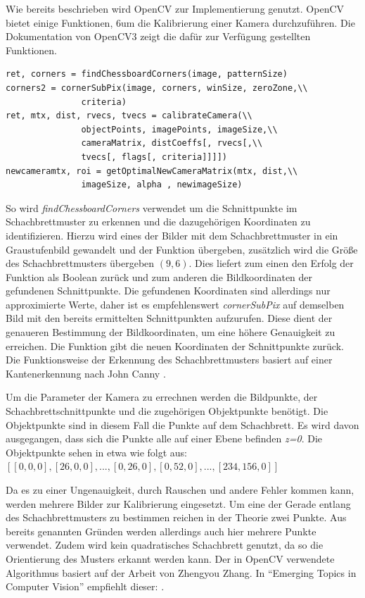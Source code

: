 Wie bereits beschrieben wird OpenCV  zur Implementierung genutzt. OpenCV bietet einige Funktionen, 6um die Kalibrierung einer Kamera durchzuführen. Die Dokumentation von OpenCV3 \autocite{Opencv3Camera2016} zeigt die dafür zur Verfügung gestellten Funktionen. 
\begin{lstlisting}[frame=single]
ret, corners = findChessboardCorners(image, patternSize) 
corners2 = cornerSubPix(image, corners, winSize, zeroZone,\\
               criteria) 
ret, mtx, dist, rvecs, tvecs = calibrateCamera(\\
               objectPoints, imagePoints, imageSize,\\
               cameraMatrix, distCoeffs[, rvecs[,\\
               tvecs[, flags[, criteria]]]]) 
newcameramtx, roi = getOptimalNewCameraMatrix(mtx, dist,\\
               imageSize, alpha , newimageSize)
\end{lstlisting}
So wird \textit{findChessboardCorners} verwendet um die Schnittpunkte im Schachbrettmuster zu erkennen und die dazugehörigen Koordinaten zu identifizieren. Hierzu wird eines der Bilder mit dem Schachbrettmuster in ein Graustufenbild gewandelt und der Funktion übergeben, zusätzlich wird die Größe des Schachbrettmusters übergeben $(9,6)$. Dies liefert zum einen den Erfolg der Funktion als Boolean zurück und zum anderen die Bildkoordinaten der gefundenen Schnittpunkte. 
Die gefundenen Koordinaten sind allerdings nur approximierte Werte, daher ist es empfehlenswert \textit{cornerSubPix} auf demselben Bild mit den bereits ermittelten Schnittpunkten aufzurufen. Diese dient der genaueren Bestimmung der Bildkoordinaten, um eine höhere Genauigkeit zu erreichen. Die Funktion gibt die neuen Koordinaten der Schnittpunkte zurück. 
Die Funktionsweise der Erkennung des Schachbrettmusters basiert auf einer Kantenerkennung nach John Canny \autocite{canny1986}.

Um die Parameter der Kamera zu errechnen werden die Bildpunkte, der Schachbrettschnittpunkte und die zugehörigen Objektpunkte benötigt. Die Objektpunkte sind in diesem Fall die Punkte auf dem Schachbrett. Es wird davon ausgegangen, dass sich die Punkte alle auf einer Ebene befinden \textit{z=0}. Die Objektpunkte sehen in etwa wie folgt aus: $[[0,0,0], [26,0,0],...,[0,26,0],[0,52,0],...,[234,156,0]]$

Da es zu einer Ungenauigkeit, durch Rauschen und andere Fehler kommen kann, werden mehrere Bilder zur Kalibrierung eingesetzt. Um eine der Gerade entlang des Schachbrettmusters zu bestimmen reichen in der Theorie zwei Punkte. Aus bereits genannten Gründen werden allerdings auch hier mehrere Punkte verwendet. Zudem wird kein quadratisches Schachbrett genutzt, da so die Orientierung des Musters erkannt werden kann. 
Der in OpenCV verwendete Algorithmus basiert auf der Arbeit von Zhengyou Zhang. In "`Emerging Topics in Computer Vision"' \autocite{Medioni:2004:ETC:993884} empfiehlt dieser:  \autocite[24]{Zhang2000}.


